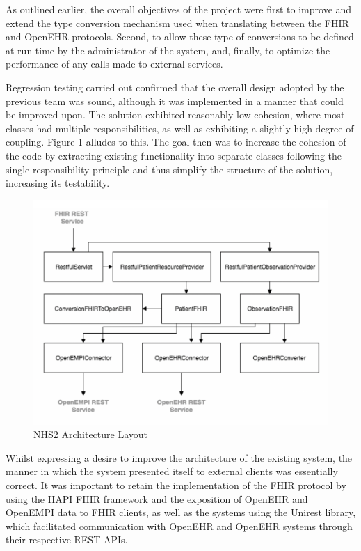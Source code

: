 \documentclass[sigconf]{acmart}
\begin{document}
As outlined earlier, the overall objectives of the project were first to improve and extend the type conversion mechanism used when translating between the FHIR and OpenEHR protocols. Second, to allow these type of conversions to be defined at run time by the administrator of the system, and, finally, to optimize the performance of any calls made to external services.

Regression testing carried out confirmed that the overall design adopted by the previous team was sound, although it was implemented in a manner that could be improved upon. The solution exhibited reasonably low cohesion, where most classes had multiple responsibilities, as well as exhibiting a slightly high degree of coupling. Figure 1 alludes to this. The goal then was to increase the cohesion of the code by extracting existing functionality into separate classes following the single responsibility principle and thus simplify the structure of the solution, increasing its testability.

\begin{figure}[!!h] 
	\centering 
	\includegraphics[width=0.8\columnwidth]{Figure1.png}
	\caption{NHS2 Architecture Layout} 
	\label{fig:oldarch}
\end{figure}

Whilst expressing a desire to improve the architecture of the existing system, the manner in which the system presented itself to external clients was essentially correct. It was important to retain the implementation of the FHIR protocol by using the HAPI FHIR framework and the exposition of OpenEHR and OpenEMPI data to FHIR clients, as well as the systems using the Unirest library, which facilitated communication with OpenEHR and OpenEHR systems through their respective REST APIs.
\end{document}
